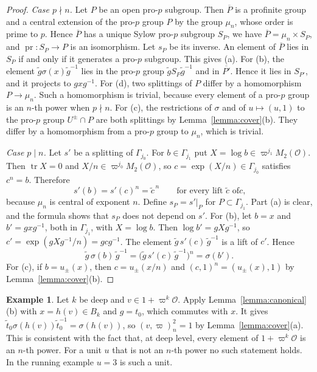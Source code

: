 \documentclass[12pt,letterpaper]{amsart}
\numberwithin{equation}{section}
\theoremstyle{definition}
\newtheorem{example}[theorem]{Example}
\theoremstyle{remark}
\DeclareMathOperator{\pr}{pr}
\DeclareMathOperator{\tr}{tr}
\newcommand{\cO}{\mathcal{O}}
\begin{document}
\begin{proof}
\emph{Case $p\nmid n$.} Let $P$ be an open pro-$p$ subgroup. Then
$\overline{P}$ is a profinite group and a central extension of the
pro-$p$ group $P$ by the group $\mu_n$, whose order is prime to $p$.
Hence $\overline{P}$ has a unique Sylow pro-$p$ subgroup $S_P$, we have
$\overline{P}=\mu_n\times S_P$, and $\pr:S_P\to P$ is an isomorphism.
Let $s_P$ be its inverse. An element of $\overline{P}$ lies in $S_P$ if
and only if it generates a pro-$p$ subgroup. This gives (a). For (b),
the element $\tilde g\sigma(x)\tilde g^{-1}$ lies in the pro-$p$ group
$\tilde gS_P\tilde g^{-1}$ and in $\overline{P'}$. Hence it lies in
$S_{P'}$, and it projects to $gxg^{-1}$. For (d), two splittings of $P$
differ by a homomorphism $P\to\mu_n$. Such a homomorphism is trivial,
because every element of a pro-$p$ group is an $n$-th power when
$p\nmid n$. For (c), the restrictions of $\sigma$ and of
$u\mapsto(u,1)$ to the pro-$p$ group $U^\pm\cap P$ are both splittings
by Lemma~\ref{lemma:cover}(b). They differ by a homomorphism from a
pro-$p$ group to $\mu_n$, which is trivial.

\emph{Case $p\mid n$.} Let $s'$ be a splitting of $\Gamma_{j_0}$. For
$b\in\Gamma_{j_1}$ put $X=\log b\in\varpi^{j_1}M_2(\cO)$. Then
$\tr X=0$ and $X/n\in\varpi^{j_0}M_2(\cO)$, so
$c=\exp(X/n)\in\Gamma_{j_0}$ satisfies $c^n=b$. Therefore
\[
s'(b)=s'(c)^n=\tilde c^{\,n}\qquad\mbox{for every lift $\tilde c$ of
$c$,}
\]
because $\mu_n$ is central of exponent $n$. Define $s_P=s'|_P$ for
$P\subset\Gamma_{j_1}$. Part (a) is clear, and the formula shows that
$s_P$ does not depend on $s'$. For (b), let $b=x$ and $b'=gxg^{-1}$,
both in $\Gamma_{j_1}$, with $X=\log b$. Then $\log b'=gXg^{-1}$, so
$c'=\exp(gXg^{-1}/n)=gcg^{-1}$. The element
$\tilde g\,s'(c)\,\tilde g^{-1}$ is a lift of $c'$. Hence
\[
\tilde g\,\sigma(b)\,\tilde g^{-1}
=\bigl(\tilde g\,s'(c)\,\tilde g^{-1}\bigr)^n=\sigma(b').
\]
For (c), if $b=u_\pm(x)$, then $c=u_\pm(x/n)$ and
$(c,1)^n=(u_\pm(x),1)$ by Lemma~\ref{lemma:cover}(b).
\end{proof}

\begin{example}
\label{ex:canonical}
Let $k$ be deep and $v\in 1+\varpi^k\cO$. Apply
Lemma~\ref{lemma:canonical}(b) with $x=h(v)\in B_k$ and $g=t_0$, which
commutes with $x$. It gives
$\tilde t_0\sigma(h(v))\tilde t_0^{-1}=\sigma(h(v))$, so
$(v,\varpi)_n^2=1$ by Lemma~\ref{lemma:cover}(a). This is consistent
with the fact that, at deep level, every element of $1+\varpi^k\cO$ is
an $n$-th power. For a unit $u$ that is not an $n$-th power no such
statement holds. In the running example $u=3$ is such a unit.
\end{example}
\end{document}
